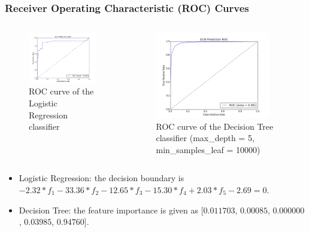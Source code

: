 \documentclass{beamer}
\begin{document}
\begin{frame}
\frametitle{Receiver Operating Characteristic (ROC) Curves}
 \begin{columns}[c]
\begin{figure}
\centering
\includegraphics[width=5cm]{LRRoc.png}
\caption{ROC curve of the Logistic Regression classifier}
\label{LRRoc}
\end{figure}
 \begin{figure}
     \includegraphics[width=5cm]{DecisionTreeRoc.png}
\caption{ROC curve of the Decision Tree classifier (max\_depth = 5, min\_samples\_leaf = 10000)}
\label{DecisionTreeRoc}

   \end{figure}
\end{columns}
\begin{itemize}
\item Logistic Regression: the decision boundary is $ -2.32*f_{1} - 33.36*f_{2} - 12.65*f_{3} - 15.30*f_{4} + 2.03*f_{5} - 2.69 = 0$.
\item Decision Tree: the feature importance is given as [$0.011703$, $0.00085$, $0.000000$, $0.03985$, $0.94760$].
\end{itemize}
\end{frame}
\end{document}

